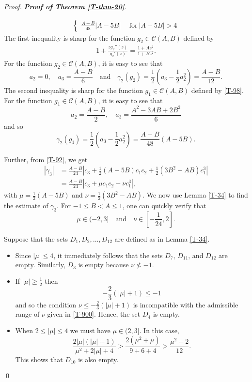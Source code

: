 \documentclass[a4paper,12pt]{amsart}
\theoremstyle{definition}
\newenvironment{pf}[1][]{%
 \vskip 3mm
 \noindent
 \ifthenelse{\equal{#1}{}}%
  {{\slshape Proof. }}%
  {{\slshape #1.} }%
 }%
{\qed\bigskip}
\begin{document}
\begin{pf}[\textbf{Proof of Theorem \ref{T-thm-20}}]
\begin{align*}
\begin{cases}
\frac{A-B}{48}|A-5B| & ~~\text{for}~ |A-5B|>4
 \end{cases}
\end{align*}
The first inequality is sharp for the function $g_2\in\mathcal{C}(A,B)$ defined by
\begin{align}\label{T-93}
1 + \frac{zg_2''(z)}{g_2'(z)} = \frac{1+Az^2}{1+Bz^2}.
\end{align}
For the function $g_2\in\mathcal{C}(A,B)$, it is easy to see that
$$
a_2=0,\quad a_3=\frac{A-B}{6}\quad\text{and}\quad\gamma_2(g_2)=\frac{1}{2}\left(a_3-\frac{1}{2}a_2^2\right)=\frac{A-B}{12}.
$$
The second inequality is sharp for the function $g_1\in\mathcal{C}(A,B)$ defined by \eqref{T-98}. For the function $g_1\in\mathcal{C}(A,B)$, it is easy to see that
$$
a_2=\frac{A-B}{2},\quad a_3=\frac{A^2-3AB+2B^2}{6}
$$
and so 
$$\gamma_2(g_1)=\frac{1}{2}\left(a_3-\frac{1}{2}a_2^2\right)=\frac{A-B}{48}(A-5B).$$




Further, from \eqref{T-92}, we get
\begin{align}\label{T-905}
|\gamma_{3}|
&=\frac{A-B}{24}\left|c_3+\frac{1}{2}(A-5B)c_{1}c_{2}+\frac{1}{2}(3B^2-AB)c_1^3\right|\\
&= \frac{A-B}{24}\left|c_3+\mu c_{1}c_{2}+\nu c_1^3\right|\nonumber,
\end{align}
with \(\mu = \frac{1}{2}(A - 5B)\) and \(\nu = \frac{1}{2}(3B^2 - AB)\). We now use Lemma \ref{T-34} to find the estimate of $\gamma_3$. For \(-1 \leq B < A \leq 1\), one can quickly verify that 
\begin{equation}\label{T-900}
\mu \in (-2, 3]\quad \text{and}\quad \nu \in \left[-\frac{1}{24}, 2\right].
\end{equation}

Suppose that the sets $D_1,D_2,\ldots,D_{12}$ are defined as in Lemma \ref{T-34}.
\begin{itemize}
\item Since \(|\mu| \le 4\), it immediately follows that the sets \(D_7\), \(D_{11}\), and \(D_{12}\) are empty. Similarly, $D_3$ is empty because $\nu \not\le -1$.

\item If $|\mu|\ge \frac{1}{2}$ then
$$-\frac{2}{3}(|\mu| + 1)\le -1 $$
and so the condition $\nu \leq -\frac{2}{3}(|\mu| + 1)$ is incompatible with the admissible range of \(\nu\) given in \eqref{T-900}. Hence, the set $D_4$ is empty.

\item When $2\le |\mu|\le 4$ we must have $\mu\in(2,3]$. In this case,
$$
\frac{2|\mu|(|\mu| + 1)}{\mu^2 + 2|\mu| + 4}> \frac{2(\mu^2 + \mu)}{9 + 6 + 4}> \frac{\mu^2 + 2}{12}.
$$
This shows that \(D_{10}\) is also empty.


\end{itemize}
\end{pf}
\end{document}
